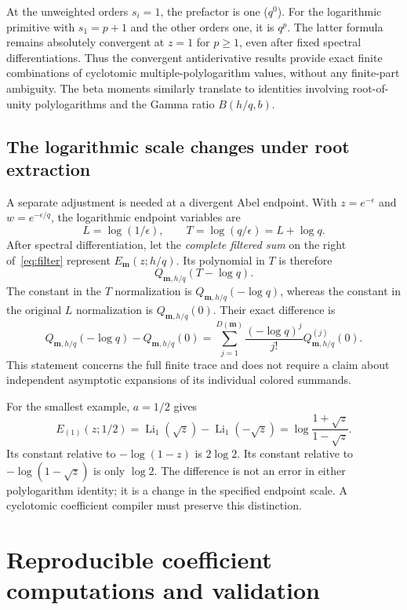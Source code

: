 \documentclass[11pt,oneside]{article}
\numberwithin{equation}{section}
\theoremstyle{definition}
\theoremstyle{remark}
\DeclareMathOperator{\Li}{Li}
\newcommand{\mm}{\mathbf m}
\begin{document}
At the unweighted orders $s_i=1$, the prefactor is one ($q^0$). For the logarithmic primitive with $s_1=p+1$ and the other
orders one, it is $q^p$. The latter formula remains absolutely convergent at
$z=1$ for $p\ge1$, even after fixed spectral differentiations. Thus the
convergent antiderivative results provide exact finite combinations of
cyclotomic multiple-polylogarithm values, without any finite-part ambiguity.
The beta moments similarly translate to identities involving root-of-unity
polylogarithms and the Gamma ratio $B(h/q,b)$.

\subsection{The logarithmic scale changes under root extraction}

A separate adjustment is needed at a divergent Abel endpoint. With
$z=e^{-\epsilon}$ and $w=e^{-\epsilon/q}$, the logarithmic endpoint variables
are
\[
L=\log(1/\epsilon),\qquad T=\log(q/\epsilon)=L+\log q.
\]
After spectral differentiation, let the \emph{complete filtered sum} on the
right of~\eqref{eq:filter} represent $E_{\mm}(z;h/q)$. Its polynomial in $T$
is therefore
\begin{equation}\label{eq:scale}
Q_{\mm,h/q}(T-\log q).
\end{equation}
The constant in the $T$ normalization is $Q_{\mm,h/q}(-\log q)$, whereas the
constant in the original $L$ normalization is $Q_{\mm,h/q}(0)$. Their exact
difference is
\begin{equation}\label{eq:scale-difference}
Q_{\mm,h/q}(-\log q)-Q_{\mm,h/q}(0)
=\sum_{j=1}^{D(\mm)}\frac{(-\log q)^j}{j!}Q_{\mm,h/q}^{(j)}(0).
\end{equation}
This statement concerns the full finite trace and does not require a claim
about independent asymptotic expansions of its individual colored summands.

For the smallest example, $a=1/2$ gives
\[
E_{(1)}(z;1/2)=\Li_1(\sqrt z)-\Li_1(-\sqrt z)
=\log\frac{1+\sqrt z}{1-\sqrt z}.
\]
Its constant relative to $-\log(1-z)$ is $2\log2$. Its constant relative to
$-\log(1-\sqrt z)$ is only $\log2$. The difference is not an error in either
polylogarithm identity; it is a change in the specified endpoint scale.
A cyclotomic coefficient compiler must preserve this distinction.

\section{Reproducible coefficient computations and validation}
\label{sec:verification}
\end{document}
